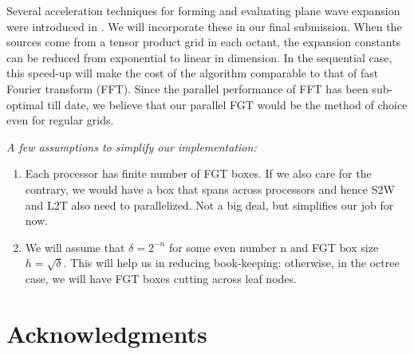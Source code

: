 \documentclass[conference]{IEEEtran}
\begin{document}
Several acceleration techniques for forming and evaluating plane wave expansion were introduced in \cite{fggt}. We will incorporate these in our final submission. When the sources come from a tensor product grid in each octant, the expansion constants can be reduced from exponential to linear in dimension. In the sequential case, this speed-up will make the cost of the algorithm comparable to that of fast Fourier transform (FFT). Since the parallel performance of FFT has been sub-optimal till date, we believe that our parallel FGT would be the method of choice even for regular grids. 


{\em
A few assumptions to simplify our implementation: 
\begin{enumerate}
\item Each processor has finite number of FGT boxes. If we also care for the contrary, we would have a box that spans across processors and hence S2W and L2T also need to parallelized. Not a big deal, but simplifies our job for now. 
\item We will assume that $\delta = 2^{-n}$ for some even number n and FGT box size $h = \sqrt{\delta}$. This will help us in reducing book-keeping: otherwise, in the octree case, we will have FGT boxes cutting across leaf nodes. 
\end{enumerate}
}

\section*{Acknowledgments}




\end{document}

